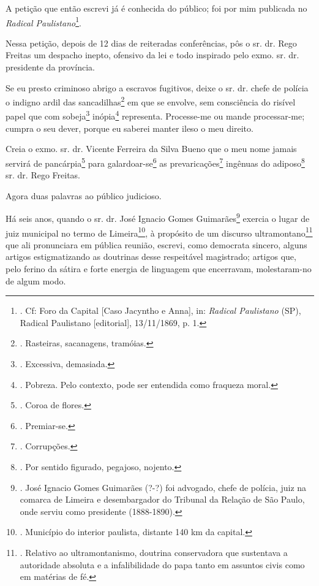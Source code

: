 A petição que então escrevi já é conhecida do público; foi por mim
publicada no \emph{Radical Paulistano}\footnote{. Cf: Foro da Capital
  {[}Caso Jacyntho e Anna{]}, in: \emph{Radical Paulistano} (SP),
  Radical Paulistano {[}editorial{]}, 13/11/1869, p. 1.}.

Nessa petição, depois de 12 dias de reiteradas conferências, pôs o sr.
dr. Rego Freitas um despacho inepto, ofensivo da lei e todo inspirado
pelo exmo. sr. dr. presidente da província.

Se eu presto criminoso abrigo a escravos fugitivos, deixe o sr. dr.
chefe de polícia o indigno ardil das sancadilhas\footnote{. Rasteiras,
  sacanagens, tramóias.} em que se envolve, sem consciência do risível
papel que com sobeja\footnote{. Excessiva, demasiada.} inópia\footnote{.
  Pobreza. Pelo contexto, pode ser entendida como fraqueza moral.}
representa. Processe-me ou mande processar-me; cumpra o seu dever,
porque eu saberei manter ileso o meu direito.

Creia o exmo. sr. dr. Vicente Ferreira da Silva Bueno que o meu nome
jamais servirá de pancárpia\footnote{. Coroa de flores.} para
galardoar-se\footnote{. Premiar-se.} as prevaricações\footnote{.
  Corrupções.} ingênuas do adiposo\footnote{. Por sentido figurado,
  pegajoso, nojento.} sr. dr. Rego Freitas.

Agora duas palavras ao público judicioso.

Há seis anos, quando o sr. dr. José Ignacio Gomes Guimarães\footnote{.
  José Ignacio Gomes Guimarães (?-?) foi advogado, chefe de polícia,
  juiz na comarca de Limeira e desembargador do Tribunal da Relação de
  São Paulo, onde serviu como presidente (1888-1890).} exercia o lugar
de juiz municipal no termo de Limeira\footnote{. Município do interior
  paulista, distante 140 km da capital.}, à propósito de um discurso
ultramontano\footnote{. Relativo ao ultramontanismo, doutrina
  conservadora que sustentava a autoridade absoluta e a infalibilidade
  do papa tanto em assuntos civis como em matérias de fé.} que ali
pronunciara em pública reunião, escrevi, como democrata sincero, alguns
artigos estigmatizando as doutrinas desse respeitável magistrado;
artigos que, pelo ferino da sátira e forte energia de linguagem que
encerravam, molestaram-no de algum modo.


